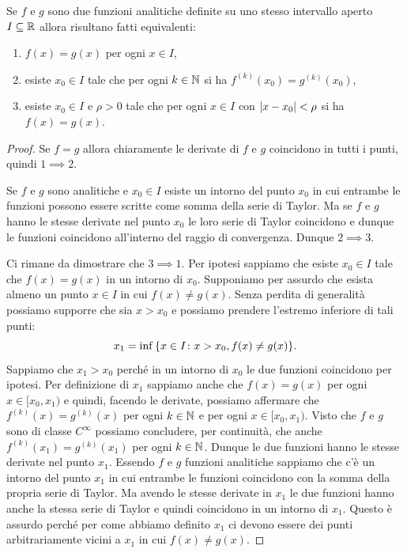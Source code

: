 \begin{theorem}
  Se $f$ e $g$ sono due funzioni analitiche definite su uno stesso intervallo
  aperto $I\subseteq {\mathbb R}$ allora risultano fatti equivalenti:
  \begin{enumerate}
   \item $f(x)=g(x)$ per ogni $x\in I$,
   \item esiste $x_0\in I$ tale che per ogni $k\in {\mathbb N}$ si ha $f^{(k)}(x_0) = g^{(k)}(x_0)$,
   \item esiste $x_0\in I$ e $\rho>0$ tale che per ogni $x\in I$ con ${\left|x-x_0\right|}<\rho$ si ha
   $f(x)=g(x)$.
  \end{enumerate}
  \end{theorem}
  \begin{proof}
  Se $f=g$ allora chiaramente le derivate di $f$ e $g$ coincidono in tutti i punti,
  quindi $1\implies 2$.
  
  Se $f$ e $g$ sono analitiche e $x_0\in I$ esiste un intorno del punto
  $x_0$ in cui entrambe le funzioni possono essere scritte come
  somma della serie di Taylor. Ma se $f$ e $g$ hanno le stesse derivate
  nel punto $x_0$ le loro serie di Taylor coincidono e dunque le funzioni
  coincidono all'interno del raggio di convergenza. Dunque $2\implies 3$.
  
  Ci rimane da dimostrare che $3 \implies 1$.
  Per ipotesi sappiamo che esiste $x_0\in I$ tale che $f(x) = g(x)$ in un intorno
  di $x_0$. Supponiamo per assurdo che esista almeno un punto $x\in I$ in cui
  $f(x) \neq g(x)$. Senza perdita di generalità possiamo supporre che sia
  $x>x_0$ e possiamo prendere l'estremo inferiore di tali punti:
  \[
    x_1 = \inf{\left\{ x\in I\colon x>x_0, f(x)\neq g(x) \right\}}.
  \]
  Sappiamo che $x_1>x_0$ perché in un intorno di $x_0$ le due funzioni
  coincidono per ipotesi. Per definizione di $x_1$ sappiamo anche
  che $f(x)=g(x)$ per ogni $x\in [x_0,x_1)$ e quindi, facendo le derivate,
  possiamo affermare che $f^{(k)}(x) = g^{(k)}(x)$ per ogni $k\in {\mathbb N}$
  e per ogni $x\in [x_0,x_1)$. Visto che $f$ e $g$ sono di classe $C^\infty$
  possiamo concludere, per continuità, che anche $f^{(k)}(x_1)=g^{(k)}(x_1)$
  per ogni $k\in {\mathbb N}$. Dunque le due funzioni hanno le stesse derivate
  nel punto $x_1$. Essendo $f$ e $g$ funzioni analitiche sappiamo
  che c'è un intorno del punto $x_1$ in cui entrambe le funzioni
  coincidono con la somma della propria serie di Taylor. Ma avendo le
  stesse derivate in $x_1$ le due funzioni hanno anche la stessa serie
  di Taylor e quindi coincidono in un intorno di $x_1$. Questo
  è assurdo perché per come abbiamo definito $x_1$ ci devono
  essere dei punti arbitrariamente vicini a $x_1$ in cui $f(x)\neq g(x)$.
  \end{proof}
  
